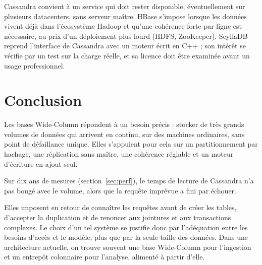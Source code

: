 \documentclass[11pt,a4paper]{article}
\begin{document}
Cassandra convient à un service qui doit rester disponible, éventuellement sur plusieurs datacenters, sans serveur maître. HBase s'impose lorsque les données vivent déjà dans l'écosystème Hadoop et qu'une cohérence forte par ligne est nécessaire, au prix d'un déploiement plus lourd (HDFS, ZooKeeper). ScyllaDB reprend l'interface de Cassandra avec un moteur écrit en C++ ; son intérêt se vérifie par un test sur la charge réelle, et sa licence doit être examinée avant un usage professionnel.

\section*{Conclusion}

Les bases Wide-Column répondent à un besoin précis : stocker de très grands volumes de données qui arrivent en continu, sur des machines ordinaires, sans point de défaillance unique. Elles s'appuient pour cela sur un partitionnement par hachage, une réplication sans maître, une cohérence réglable et un moteur d'écriture en ajout seul.

Sur dix ans de mesures (section~\ref{sec:perf}), le temps de lecture de Cassandra n'a pas bougé avec le volume, alors que la requête imprévue a fini par échouer.

Elles imposent en retour de connaître les requêtes avant de créer les tables, d'accepter la duplication et de renoncer aux jointures et aux transactions complexes. Le choix d'un tel système se justifie donc par l'adéquation entre les besoins d'accès et le modèle, plus que par la seule taille des données. Dans une architecture actuelle, on trouve souvent une base Wide-Column pour l'ingestion et un entrepôt colonnaire pour l'analyse, alimenté à partir d'elle.
\end{document}
